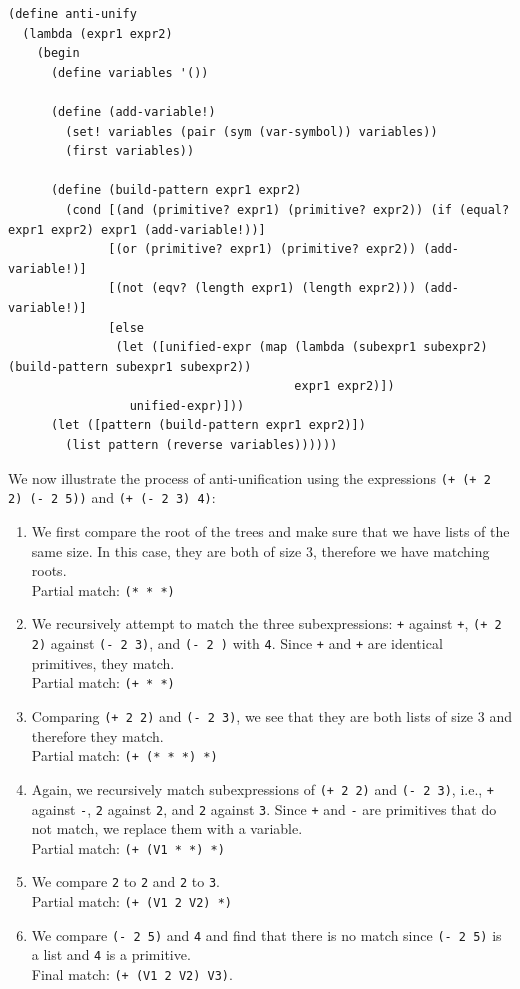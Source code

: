 \documentclass[a4paper,10pt]{article}
\begin{document}
\begin{lstlisting}[frame=trbl]
(define anti-unify
  (lambda (expr1 expr2)
    (begin
      (define variables '())

      (define (add-variable!)
        (set! variables (pair (sym (var-symbol)) variables))
        (first variables))
      
      (define (build-pattern expr1 expr2)
        (cond [(and (primitive? expr1) (primitive? expr2)) (if (equal? expr1 expr2) expr1 (add-variable!))]
              [(or (primitive? expr1) (primitive? expr2)) (add-variable!)]
              [(not (eqv? (length expr1) (length expr2))) (add-variable!)]
              [else
               (let ([unified-expr (map (lambda (subexpr1 subexpr2) (build-pattern subexpr1 subexpr2))
                                        expr1 expr2)])
                 unified-expr)]))
      (let ([pattern (build-pattern expr1 expr2)])
        (list pattern (reverse variables))))))
\end{lstlisting}

We now illustrate the process of anti-unification using the expressions \texttt{(+ (+ 2 2) (- 2 5))} and \texttt{(+ (- 2 3) 4)}:
\begin{enumerate}
\item We first compare the root of the trees and make sure that we have lists of the same size. In this case, they are both of size $3$, therefore we have matching roots. \\
  Partial match: \texttt{(* * *)}
\item We recursively attempt to match the three subexpressions: \texttt{+} against \texttt{+}, \texttt{(+ 2 2)} against \texttt{(- 2 3)}, and \texttt{(- 2 )} with \texttt{4}. Since \texttt{+} and \texttt{+} are identical primitives, they match. \\
  Partial match: \texttt{(+ * *)}
\item Comparing \texttt{(+ 2 2)} and \texttt{(- 2 3)}, we see that they are both lists of size 3 and therefore they match. \\
  Partial match: \texttt{(+ (* * *) *)}
\item Again, we recursively match subexpressions of \texttt{(+ 2 2)} and \texttt{(- 2 3)}, i.e., \texttt{+} against \texttt{-}, \texttt{2} against \texttt{2}, and \texttt{2} against \texttt{3}. Since \texttt{+} and \texttt{-} are primitives that do not match, we replace them with a variable. \\
  Partial match: \texttt{(+ (V1 * *) *)}
\item We compare \texttt{2} to \texttt{2} and \texttt{2} to \texttt{3}. \\
  Partial match: \texttt{(+ (V1 2 V2) *)}
\item We compare \texttt{(- 2 5)} and \texttt{4} and find that there is no match since \texttt{(- 2 5)} is a list and \texttt{4} is a primitive. \\
  Final match: \texttt{(+ (V1 2 V2) V3)}.
\end{enumerate}
\end{document}
